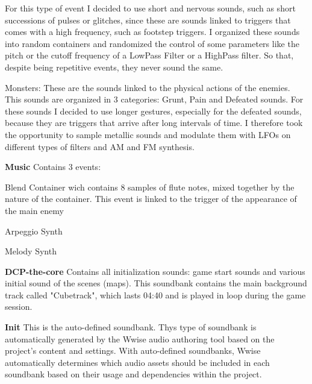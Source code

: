 \begin{compactitem}
\begin{compactitem}
				For this type of event I decided to use short and nervous sounds, such as short successions of pulses or glitches, since these are sounds linked to triggers that comes with a high frequency, such as footstep triggers.
				I organized these sounds into random containers and randomized the control of some parameters like the pitch or the cutoff frequency of a LowPass Filter or a HighPass filter. So that, despite being repetitive events, they never sound the same.
				\item Monsters: These are the sounds linked to the physical actions of the enemies. This sounds are organized in 3 categories: Grunt, Pain and Defeated sounds.
				For these sounds I decided to use longer gestures, especially for the defeated sounds, because they are triggers that arrive after long intervals of time. I therefore took the opportunity to sample metallic sounds and modulate them with LFOs on different types of filters and AM and FM synthesis.
			\end{compactitem}
		\item \textbf{Music} Contains 3 events:
			\begin{compactitem}
				\item Blend Container wich contains 8 samples of flute notes, mixed together by the nature of the container. This event is linked to the trigger of the appearance of the main enemy
				\item Arpeggio Synth
				\item Melody Synth
			\end{compactitem}
		\item \textbf{DCP-the-core} Contains all initialization sounds: game start sounds and various initial sound of the scenes (maps). This soundbank contains the main background track called "Cubetrack", which lasts 04:40 and is played in loop during the game session.
		\item \textbf{Init} This is the auto-defined soundbank. Thys type of soundbank is automatically generated by the Wwise audio authoring tool based on the project's content and settings.		
		With auto-defined soundbanks, Wwise automatically determines which audio assets should be included in each soundbank based on their usage and dependencies within the project.
	\end{compactitem}

